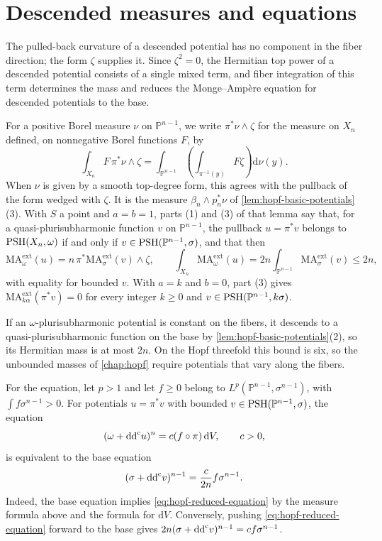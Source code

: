 \section{Descended measures and equations}

The pulled-back curvature of a descended potential has no component in the fiber direction; the form $\zeta$ supplies it. Since $\zeta^2=0$, the Hermitian top power of a descended potential consists of a single mixed term, and fiber integration of this term determines the mass and reduces the Monge--Amp\`ere equation for descended potentials to the base.

For a positive Borel measure $\nu$ on $\mathbb P^{n-1}$, we write $\pi^*\nu\wedge\zeta$ for the measure on $X_n$ defined, on nonnegative Borel functions $F$, by
\[
 \int_{X_n}F\,\pi^*\nu\wedge\zeta
 =\int_{\mathbb P^{n-1}}
        \left(\int_{\pi^{-1}(y)}F\zeta\right)\mathrm{d}\nu(y).
\]
When $\nu$ is given by a smooth top-degree form, this agrees with the pullback of the form wedged with $\zeta$. It is the measure $\beta_n\wedge p_n^*\nu$ of \cref{lem:hopf-basic-potentials}(3). With $S$ a point and $a=b=1$, parts (1) and (3) of that lemma say that, for a quasi-plurisubharmonic function $v$ on $\mathbb P^{n-1}$, the pullback $u=\pi^*v$ belongs to $\mathrm{PSH}(X_n,\omega)$ if and only if $v\in\mathrm{PSH}(\mathbb P^{n-1},\sigma)$, and that then
\[
 \mathrm{MA}^{\mathrm{ext}}_\omega(u)
 =n\,\pi^*\mathrm{MA}^{\mathrm{ext}}_\sigma(v)\wedge\zeta,
 \qquad
 \int_{X_n}\mathrm{MA}^{\mathrm{ext}}_\omega(u)
 =2n\int_{\mathbb P^{n-1}}\mathrm{MA}^{\mathrm{ext}}_\sigma(v)
 \leq2n,
\]
with equality for bounded $v$. With $a=k$ and $b=0$, part (3) gives $\mathrm{MA}^{\mathrm{ext}}_{k\alpha}(\pi^*v)=0$ for every integer $k\geq0$ and $v\in\mathrm{PSH}(\mathbb P^{n-1},k\sigma)$.

If an $\omega$-plurisubharmonic potential is constant on the fibers, it descends to a quasi-plurisubharmonic function on the base by \cref{lem:hopf-basic-potentials}(2), so its Hermitian mass is at most $2n$. On the Hopf threefold this bound is six, so the unbounded masses of \cref{chap:hopf} require potentials that vary along the fibers.

For the equation, let $p>1$ and let $f\geq0$ belong to $L^p(\mathbb P^{n-1},\sigma^{n-1})$, with $\int f\sigma^{n-1}>0$. For potentials $u=\pi^*v$ with bounded $v\in\mathrm{PSH}(\mathbb P^{n-1},\sigma)$, the equation
\begin{equation}\label{eq:hopf-reduced-equation}\index{Monge--Ampere equation@Monge--Amp\`ere equation!Hopf reduction}
 (\omega+\ddc u)^n=c(f\circ\pi)\,\mathrm{d}V,\qquad c>0,
\end{equation}
is equivalent to the base equation
\[
 (\sigma+\mathrm{dd}^{\mathrm{c}} v)^{n-1}=\frac{c}{2n}f\sigma^{n-1}.
\]
Indeed, the base equation implies \eqref{eq:hopf-reduced-equation} by the measure formula above and the formula for $\mathrm{d}V$. Conversely, pushing \eqref{eq:hopf-reduced-equation} forward to the base gives $2n(\sigma+\mathrm{dd}^{\mathrm{c}} v)^{n-1}=cf\sigma^{n-1}$.

